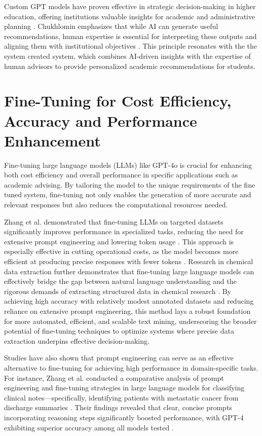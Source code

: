 \documentclass[12pt,oneside,openany]{report}
\begin{document}
Custom GPT models have proven effective in strategic decision-making in higher education, offering institutions valuable insights for academic and administrative planning \cite{chukhlomin2024}. Chukhlomin emphasizes that while AI can generate useful recommendations, human expertise is essential for interpreting these outputs and aligning them with institutional objectives \cite{chukhlomin2024}. This principle resonates with the the system created system, which combines AI-driven insights with the expertise of human advisors to provide personalized academic recommendations for students.


\section{Fine-Tuning for Cost Efficiency, Accuracy and  Performance Enhancement}

Fine-tuning large language models (LLMs) like GPT-4o is crucial for enhancing both cost efficiency and overall performance in specific applications such as academic advising. By tailoring the model to the unique requirements of the fine tuned system, fine-tuning not only enables the generation of more accurate and relevant responses but also reduces the computational resources needed.

Zhang et al. demonstrated that fine-tuning LLMs on targeted datasets significantly improves performance in specialized tasks, reducing the need for extensive prompt engineering and lowering token usage \cite{D4SC00924J}. This approach is especially effective in cutting operational costs, as the model becomes more efficient at producing precise responses with fewer tokens \cite{D4SC00924J}. Research in chemical data extraction further demonstrates that fine-tuning large language models can effectively bridge the gap between natural language understanding and the rigorous demands of extracting structured data in chemical research \cite{D4SC00924J}. By achieving high accuracy with relatively modest annotated datasets and reducing reliance on extensive prompt engineering, this method lays a robust foundation for more automated, efficient, and scalable text mining, underscoring the broader potential of fine-tuning techniques to optimize systems where precise data extraction underpins effective decision-making.

Studies have also shown that prompt engineering can serve as an effective alternative to fine-tuning for achieving high performance in domain-specific tasks. For instance, Zhang et al. conducted a comparative analysis of prompt engineering and fine-tuning strategies in large language models for classifying clinical notes—specifically, identifying patients with metastatic cancer from discharge summaries \cite{Zhang2024Comparison}. Their findings revealed that clear, concise prompts incorporating reasoning steps significantly boosted performance, with GPT-4 exhibiting superior accuracy among all models tested \cite{Zhang2024Comparison}.
\end{document}
